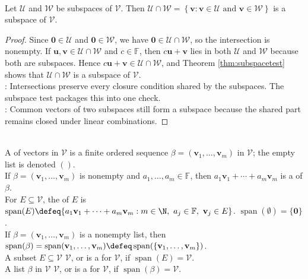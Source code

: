 \begin{proposition} \label{prop:intersectionsubspaces} \\
Let $\mathcal{U}$ and $\mathcal{W}$ be subspaces of $\mathcal{V}$. Then $\mathcal{U}\cap\mathcal{W} = \left\{ \mathbf{v} : \mathbf{v}\in\mathcal{U} \text{ and } \mathbf{v}\in\mathcal{W} \right\}$ is a subspace of $\mathcal{V}$.
\begin{proof}
Since $\mathbf{0}\in\mathcal{U}$ and $\mathbf{0}\in\mathcal{W}$, we have $\mathbf{0}\in\mathcal{U}\cap\mathcal{W}$, so the intersection is nonempty. If $\mathbf{u},\mathbf{v}\in\mathcal{U}\cap\mathcal{W}$ and $c\in\mathbb{F}$, then $c\mathbf{u}+\mathbf{v}$ lies in both $\mathcal{U}$ and $\mathcal{W}$ because both are subspaces. Hence $c\mathbf{u}+\mathbf{v}\in\mathcal{U}\cap\mathcal{W}$, and Theorem \ref{thm:subspacetest} shows that $\mathcal{U}\cap\mathcal{W}$ is a subspace of $\mathcal{V}$.\\
: Intersections preserve every closure condition shared by the subspaces. The subspace test packages this into one check.\\
: Common vectors of two subspaces still form a subspace because the shared part remains closed under linear combinations.
\end{proof}
\end{proposition}

\begin{definition} \\
A  of vectors in $\mathcal{V}$ is a finite ordered sequence $\beta = (\mathbf{v}_1,\ldots,\mathbf{v}_m)$ in $\mathcal{V}$; the empty list is denoted $()$.\\
If $\beta=(\mathbf{v}_1,\ldots,\mathbf{v}_m)$ is nonempty and $a_1,\ldots,a_m\in\mathbb{F}$, then $a_1\mathbf{v}_1+\cdots+a_m\mathbf{v}_m$ is a  of $\beta$.\\
For $E\subseteq\mathcal{V}$, the  of $E$ is $\operatorname{span}(E)\defeq\{a_1\mathbf{v}_1+\cdots+a_m\mathbf{v}_m:m\in\N,\ a_j\in\mathbb{F},\ \mathbf{v}_j\in E\}$. $\operatorname{span}(\emptyset)=\{\mathbf{0}\}$.\\
If $\beta=(\mathbf{v}_1,\ldots,\mathbf{v}_m)$ is a nonempty list, then $\operatorname{span}(\beta) = \operatorname{span}(\mathbf{v}_1,\ldots,\mathbf{v}_m)
\defeq \operatorname{span}(\{\mathbf{v}_1,\ldots,\mathbf{v}_m\})$.\\
A subset $E \subseteq \mathcal{V}$  $\mathcal{V}$, or is a  for $\mathcal{V}$, if $\operatorname{span}(E)=\mathcal{V}$.\\
A list $\beta$ in $\mathcal{V}$  $\mathcal{V}$, or is a  for $\mathcal{V}$, if $\operatorname{span}(\beta)=\mathcal{V}$.
\end{definition}

